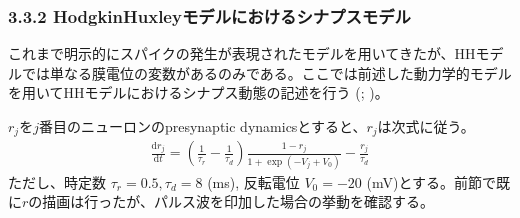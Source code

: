 \documentclass[letterpaper,10pt,english]{sphinxmanual}
\begin{document}
\subsubsection{3.3.2 Hodgkin\sphinxhyphen{}Huxleyモデルにおけるシナプスモデル}
\label{\detokenize{3-4_kinetic-synapse:hodgkin-huxley}}
これまで明示的にスパイクの発生が表現されたモデルを用いてきたが、HHモデルでは単なる膜電位の変数があるのみである。ここでは前述した動力学的モデルを用いてHHモデルにおけるシナプス動態の記述を行う (; )。

\(r_{j}\)を\(j\)番目のニューロンのpre\sphinxhyphen{}synaptic dynamicsとすると、\(r_{j}\)は次式に従う。
\begin{equation*}
\begin{split}
\frac{\mathrm{d} r_{j}}{\mathrm{d} t}=\left(\frac{1}{\tau_{r}}-\frac{1}{\tau_{d}}\right) \frac{1-r_{j}}{1+\exp \left(-V_{j}+V_{0}\right)}-\frac{r_{j}}{\tau_{d}}
\end{split}
\end{equation*}
ただし、時定数 \(\tau_r=0.5, \tau_d = 8\) (ms), 反転電位 \(V_0 = -20\) (mV)とする。前節で既に\(r\)の描画は行ったが、パルス波を印加した場合の挙動を確認する。
\end{document}
